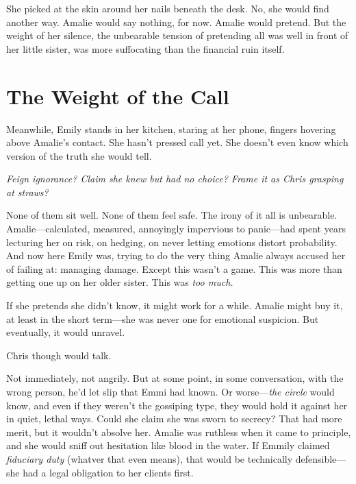 \smallskip

She picked at the skin around her nails beneath the desk. No, she would find another way. Amalie would say nothing, for now. Amalie would pretend. But the weight of her silence, the unbearable tension of pretending all was well in front of her little sister, was more suffocating than the financial ruin itself.

\section*{The Weight of the Call}

Meanwhile, Emily stands in her kitchen, staring at her phone, fingers hovering above Amalie’s contact. She hasn’t pressed call yet.  She doesn’t even know which version of the truth she would tell.  

\textit{Feign ignorance? Claim she knew but had no choice? Frame it as Chris grasping at straws?}  

None of them sit well. None of them feel safe.  The irony of it all is unbearable. Amalie—calculated, measured, annoyingly impervious to panic—had spent years lecturing her on risk, on hedging, on never letting emotions distort probability. And now here Emily was, trying to do the very thing Amalie always accused her of failing at: managing damage.  Except this wasn’t a game.  This was more than getting one up on her older sister. This was \textit{too much.}  

\smallskip

If she pretends she didn’t know, it might work for a while. Amalie might buy it, at least in the short term—she was never one for emotional suspicion. But eventually, it would unravel. 

\smallskip

Chris though would talk.  

Not immediately, not angrily. But at some point, in some conversation, with the wrong person, he’d let slip that Emmi had known. Or worse—\textit{the circle} would know, and even if they weren’t the gossiping type, they would hold it against her in quiet, lethal ways.  Could she claim she was sworn to secrecy?  That had more merit, but it wouldn’t absolve her. Amalie was ruthless when it came to principle, and she would sniff out hesitation like blood in the water. If Emmily claimed \textit{fiduciary duty} (whatver that even means), that would be technically defensible—she had a legal obligation to her clients first.  


